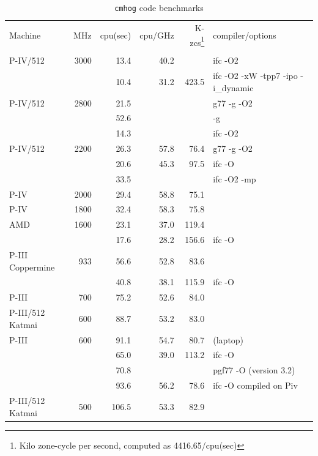 \documentclass[10pt,dvips]{article}
\begin{document}
\begin{table}[htbp]
\centering
\medskip
\caption{{\tt cmhog} code benchmarks}
\begin{tabular}{|l|r|r|r|r|l|} \hline
Machine & MHz  	      
	& cpu(sec) 
	& cpu/GHz 
	& K-zcs\footnote{Kilo zone-cycle per second, computed as 4416.65/cpu(sec)}
	& compiler/options \\ 
&&&&&  \\ \hline
P-IV/512        & 3000  &        13.4 & 40.2  &       & ifc -O2 \\  %
                &       &        10.4 & 31.2  & 423.5 & ifc -O2 -xW -tpp7 -ipo -i\_dynamic \\
P-IV/512	& 2800	&	 21.5 &       &       & g77 -g -O2 \\  %
                &       &        52.6 &       &       & -g \\
                &       &        14.3 &       &       & ifc -O2 \\    
P-IV/512	& 2200	&	 26.3 & 57.8  &  76.4 & g77 -g -O2 \\  %
                &       &        20.6 & 45.3  &  97.5 & ifc -O \\
		&       &        33.5 &       &       & ifc -O2 -mp \\
P-IV		& 2000  &	 29.4 & 58.8  &  75.1 &  \\  %
P-IV		& 1800  &	 32.4 & 58.3  &  75.8 &  \\  %
AMD 		& 1600  &        23.1 & 37.0  & 119.4 & \\ %
                &       &        17.6 & 28.2  & 156.6 & ifc -O \\
P-III Coppermine & 933   &	 56.6 & 52.8  &  83.6 & \\ %
                 &       &       40.8 & 38.1  & 115.9 & ifc -O \\
P-III		& 700   &	 75.2 & 52.6  &  84.0 & \\ %
P-III/512 Katmai & 600	&	 88.7 & 53.2  &  83.0 &  \\ %
P-III		& 600	&	 91.1 & 54.7  &  80.7 & (laptop) \\ %
 		& 	&	 65.0 & 39.0  & 113.2 & ifc -O \\
		&	&	 70.8 &       &       & pgf77 -O (version 3.2) \\
		&	&	 93.6 & 56.2  &  78.6 & ifc -O compiled on Piv \\
P-III/512 Katmai & 500  &	106.5 & 53.3  &  82.9 & \\  %

\end{tabular}
\end{table}
\end{document}
